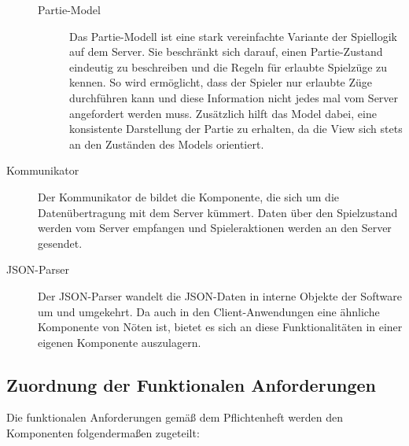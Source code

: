 \begin{description}
\begin{description}
            \item[Partie-Model]
            Das Partie-Modell ist eine stark vereinfachte Variante der Spiellogik auf dem Server. Sie beschränkt sich darauf, einen Partie-Zustand eindeutig zu beschreiben und die Regeln für erlaubte Spielzüge zu kennen. So wird ermöglicht, dass der Spieler nur erlaubte Züge durchführen kann und diese Information nicht jedes mal vom Server angefordert werden muss. Zusätzlich hilft das Model dabei, eine konsistente Darstellung der Partie zu erhalten, da die View sich stets an den Zuständen des Models orientiert.
        \end{description}
        
        \item[Kommunikator]
        Der Kommunikator de bildet die Komponente, die sich um die Datenübertragung mit dem Server kümmert. Daten über den Spielzustand werden vom Server empfangen und Spieleraktionen werden an den Server gesendet.
        
        \item[JSON-Parser]
        Der JSON-Parser wandelt die JSON-Daten in interne Objekte der Software um und umgekehrt. Da auch in den Client-Anwendungen eine ähnliche Komponente von Nöten ist, bietet es sich an diese Funktionalitäten in einer eigenen Komponente auszulagern.  

    \end{description}
    
\subsection{Zuordnung der Funktionalen Anforderungen}

Die funktionalen Anforderungen gemäß dem Pflichtenheft werden den Komponenten folgendermaßen zugeteilt:

